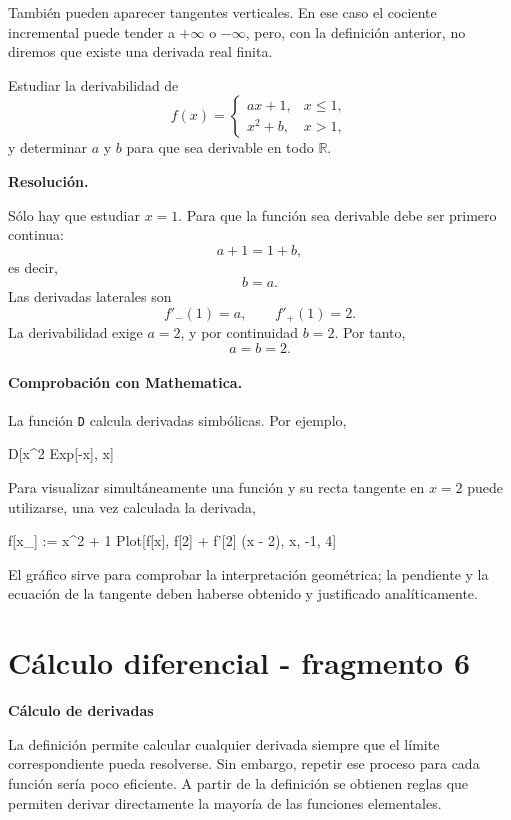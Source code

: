 También pueden aparecer tangentes verticales. En ese caso el cociente incremental puede tender a $+\infty$ o $-\infty$, pero, con la definición anterior, no diremos que existe una derivada real finita.

\begin{solvedexercise}
Estudiar la derivabilidad de
\[
f(x)=
\begin{cases}
ax+1, & x\leq1,\\
x^2+b, & x>1,
\end{cases}
\]
y determinar $a$ y $b$ para que sea derivable en todo $\mathbb{R}$.

\textbf{Resolución.}\par\smallskip
Sólo hay que estudiar $x=1$. Para que la función sea derivable debe ser primero continua:
\[
a+1=1+b,
\]
es decir,
\[
b=a.
\]
Las derivadas laterales son
\[
f'_-(1)=a,
\qquad
f'_+(1)=2.
\]
La derivabilidad exige $a=2$, y por continuidad $b=2$. Por tanto,
\[
\boxed{a=b=2}.
\]
\end{solvedexercise}

\paragraph{Comprobación con Mathematica.}
La función \texttt{D} calcula derivadas simbólicas. Por ejemplo,
\begin{mathematicacode}
D[x^2 Exp[-x], x]
\end{mathematicacode}
Para visualizar simultáneamente una función y su recta tangente en $x=2$ puede utilizarse, una vez calculada la derivada,
\begin{mathematicacode}
f[x_] := x^2 + 1
Plot[{f[x], f[2] + f'[2] (x - 2)}, {x, -1, 4}]
\end{mathematicacode}
El gráfico sirve para comprobar la interpretación geométrica; la pendiente y la ecuación de la tangente deben haberse obtenido y justificado analíticamente.


\section{Cálculo diferencial - fragmento 6}
\textbf{Cálculo de derivadas}

La definición permite calcular cualquier derivada siempre que el límite correspondiente pueda resolverse. Sin embargo, repetir ese proceso para cada función sería poco eficiente. A partir de la definición se obtienen reglas que permiten derivar directamente la mayoría de las funciones elementales.

